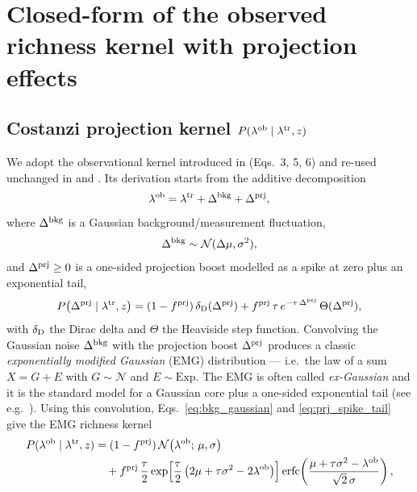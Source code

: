 \documentclass[a4paper, 11pt]{article}
\newcommand{\ltr}{\lambda^{\rm tr}}
\newcommand{\lob}{\lambda^{\rm ob}}
\begin{document}
\section{Closed-form of the observed richness kernel with projection effects}

\subsection{Costanzi projection kernel $P(\lob\mid\ltr,z)$}

We adopt the observational kernel introduced in \citet{Costanzi2019proj} (Eqs.~3, 5, 6) and re-used unchanged in \citet{Costanzi2019cosmo} and \citet{Costanzi2021}. Its derivation starts from the additive decomposition
\begin{equation}
\lob = \ltr + \Delta^{\rm bkg} + \Delta^{\rm prj},
\label{eq:lob_decomposition}
\end{equation}
where $\Delta^{\rm bkg}$ is a Gaussian background/measurement fluctuation,
\begin{equation}
\Delta^{\rm bkg}\sim\mathcal N(\Delta\mu,\sigma^2),
\label{eq:bkg_gaussian}
\end{equation}
and $\Delta^{\rm prj}\ge 0$ is a one-sided projection boost modelled as a spike at zero plus an exponential tail,
\begin{equation}
P\!\left(\Delta^{\rm prj}\mid\ltr,z\right)
=
(1-f^{\rm prj})\,\delta_{\rm D}(\Delta^{\rm prj})
+
f^{\rm prj}\,\tau\,e^{-\tau\,\Delta^{\rm prj}}\,\Theta(\Delta^{\rm prj}),
\label{eq:prj_spike_tail}
\end{equation}
with $\delta_{\rm D}$ the Dirac delta and $\Theta$ the Heaviside step function. Convolving the Gaussian noise $\Delta^{\rm bkg}$ with the projection boost $\Delta^{\rm prj}$ produces a classic \emph{exponentially modified Gaussian} (EMG) distribution --- i.e.\ the law of a sum $X=G+E$ with $G\sim\mathcal N$ and $E\sim\mathrm{Exp}$. The EMG is often called \emph{ex-Gaussian} and it is the standard model for a Gaussian core plus a one-sided exponential tail (see e.g.\ \citealt{Grushka1972}). Using this convolution, Eqs.~\eqref{eq:bkg_gaussian} and \eqref{eq:prj_spike_tail} give the EMG richness kernel
\begin{equation}
\begin{aligned}
P(\lob\mid \ltr,z)
&=
(1-f^{\rm prj})\,\mathcal N\!\left(\lob;\,\mu,\sigma\right) \\
&\quad
+
f^{\rm prj}\,
\frac{\tau}{2}
\exp\!\left[
\frac{\tau}{2}\left(2\mu+\tau\sigma^{2}-2\lob\right)
\right]
\operatorname{erfc}\!\left(
\frac{\mu+\tau\sigma^{2}-\lob}{\sqrt{2}\,\sigma}
\right),
\end{aligned}
\label{eq:costanzi_kernel}
\end{equation}
\end{document}
